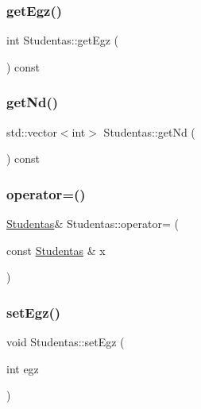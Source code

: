 \subsubsection{\texorpdfstring{getEgz()}{getEgz()}}
{\footnotesize\ttfamily int Studentas\+::get\+Egz (\begin{DoxyParamCaption}{ }\end{DoxyParamCaption}) const\hspace{0.3cm}{\ttfamily [inline]}}

\mbox{\label{class_studentas_a35a27fb46249e2630dc6836e4b7e06eb}} 
\subsubsection{\texorpdfstring{getNd()}{getNd()}}
{\footnotesize\ttfamily std\+::vector$<$int$>$ Studentas\+::get\+Nd (\begin{DoxyParamCaption}{ }\end{DoxyParamCaption}) const\hspace{0.3cm}{\ttfamily [inline]}}

\mbox{\label{class_studentas_a93171a6fec0d88ce51ed1881da18ab1b}} 
\subsubsection{\texorpdfstring{operator=()}{operator=()}}
{\footnotesize\ttfamily \mbox{\hyperlink{class_studentas}{Studentas}}\& Studentas\+::operator= (\begin{DoxyParamCaption}\item[{const \mbox{\hyperlink{class_studentas}{Studentas}} \&}]{x }\end{DoxyParamCaption})\hspace{0.3cm}{\ttfamily [inline]}}

\mbox{\label{class_studentas_ad7097a9d0431a41a0f0f63770ef6559d}} 
\subsubsection{\texorpdfstring{setEgz()}{setEgz()}}
{\footnotesize\ttfamily void Studentas\+::set\+Egz (\begin{DoxyParamCaption}\item[{int}]{egz }\end{DoxyParamCaption})\hspace{0.3cm}{\ttfamily [inline]}}

